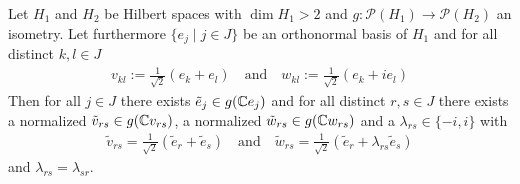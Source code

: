 \begin{lemma} \label{lemma:aux_last}
	Let $H_1$ and $H_2$ be Hilbert spaces with $\dim H_1 >2$ and $g: \mathcal{P}(H_1) \to \mathcal{P}(H_2)$ an isometry. Let furthermore $\{e_j \mid j \in J\}$ be an orthonormal basis of $H_1$ and for all distinct $k,l \in J$ 
	\begin{align*}
		v_{kl} := \frac{1}{\sqrt{2}}(e_k + e_l) \quad \text{and} \quad w_{kl} := \frac{1}{\sqrt{2}}(e_k + ie_l)
	\end{align*}
	Then for all $j \in J$ there exists $\tilde{e}_j \in g(\mathbb{C} e_j)$ and for all distinct $r,s \in J$ there exists a normalized $\tilde{v}_{rs} \in g(\mathbb{C} v_{rs})$, a normalized $\tilde{w}_{rs} \in g(\mathbb{C} w_{rs})$ and a $\lambda_{rs} \in \{-i, i\}$ with 
	\begin{align*}
		\tilde{v}_{rs} = \frac{1}{\sqrt{2}}(\tilde{e}_r + \tilde{e}_s) \quad \text{and} \quad \tilde{w}_{rs} = \frac{1}{\sqrt{2}}(\tilde{e}_r + \lambda_{rs} \tilde{e}_s)
	\end{align*}
	and $\lambda_{rs} = \lambda_{sr}$.
\end{lemma}

